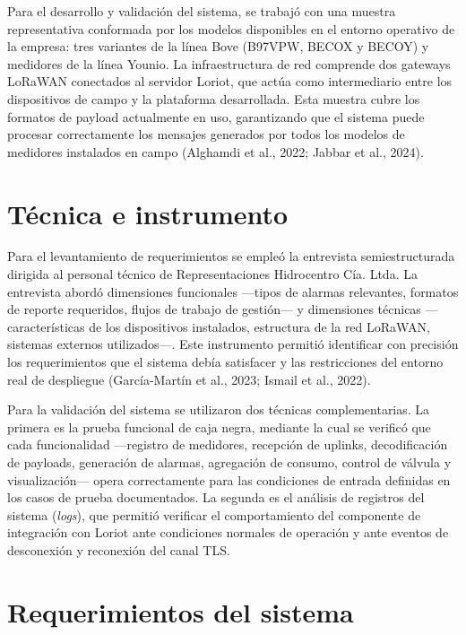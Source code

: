 \documentclass[12pt,a4paper,oneside]{report}
\begin{document}
Para el desarrollo y validación del sistema, se trabajó con una muestra representativa conformada por los modelos disponibles en el entorno operativo de la empresa: tres variantes de la línea Bove (B97VPW, BECOX y BECOY) y medidores de la línea Younio. La infraestructura de red comprende dos gateways LoRaWAN conectados al servidor Loriot, que actúa como intermediario entre los dispositivos de campo y la plataforma desarrollada. Esta muestra cubre los formatos de payload actualmente en uso, garantizando que el sistema puede procesar correctamente los mensajes generados por todos los modelos de medidores instalados en campo (Alghamdi et al., 2022; Jabbar et al., 2024).

\section{Técnica e instrumento}

Para el levantamiento de requerimientos se empleó la entrevista semiestructurada dirigida al personal técnico de Representaciones Hidrocentro Cía. Ltda. La entrevista abordó dimensiones funcionales —tipos de alarmas relevantes, formatos de reporte requeridos, flujos de trabajo de gestión— y dimensiones técnicas —características de los dispositivos instalados, estructura de la red LoRaWAN, sistemas externos utilizados—. Este instrumento permitió identificar con precisión los requerimientos que el sistema debía satisfacer y las restricciones del entorno real de despliegue (García-Martín et al., 2023; Ismail et al., 2022).

Para la validación del sistema se utilizaron dos técnicas complementarias. La primera es la prueba funcional de caja negra, mediante la cual se verificó que cada funcionalidad —registro de medidores, recepción de uplinks, decodificación de payloads, generación de alarmas, agregación de consumo, control de válvula y visualización— opera correctamente para las condiciones de entrada definidas en los casos de prueba documentados. La segunda es el análisis de registros del sistema (\textit{logs}), que permitió verificar el comportamiento del componente de integración con Loriot ante condiciones normales de operación y ante eventos de desconexión y reconexión del canal TLS.

\section{Requerimientos del sistema}\label{requerimientos-del-sistema}
\end{document}
